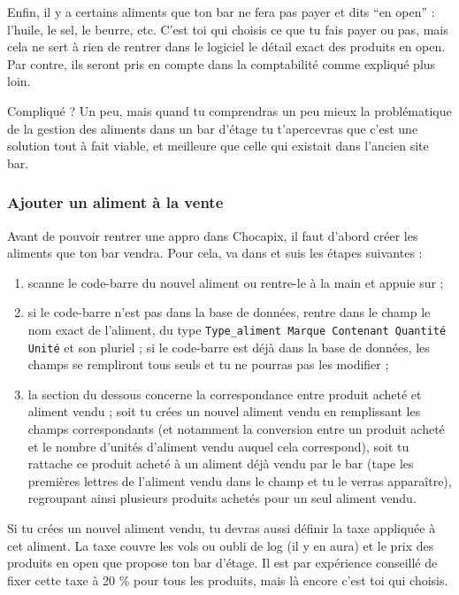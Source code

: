 \documentclass[12pt,french]{article}
\begin{document}
Enfin, il y a certains aliments que ton bar ne fera pas payer et dits \enquote{en open} : l'huile, le sel, le beurre, etc. C'est toi qui choisis ce que tu fais payer ou pas, mais cela ne sert à rien de rentrer dans le logiciel le détail exact des produits en open. Par contre, ils seront pris en compte dans la comptabilité comme expliqué plus loin.

Compliqué ? Un peu, mais quand tu comprendras un peu mieux la problématique de la gestion des aliments dans un bar d'étage tu t'apercevras que c'est une solution tout à fait viable, et meilleure que celle qui existait dans l'ancien site bar.

\subsubsection{Ajouter un aliment à la vente}

Avant de pouvoir rentrer une appro dans Chocapix, il faut d'abord créer les aliments que ton bar vendra. Pour cela, va dans  et suis les étapes suivantes :
\begin{enumerate}
	\item scanne le code-barre du nouvel aliment ou rentre-le à la main et appuie sur  ;
	\item si le code-barre n'est pas dans la base de données, rentre dans le champ  le nom exact de l'aliment, du type \texttt{Type\_aliment Marque Contenant Quantité Unité} et son pluriel ; si le code-barre est déjà dans la base de données, les champs se rempliront tous seuls et tu ne pourras pas les modifier ;
	\item la section du dessous concerne la correspondance entre produit acheté et aliment vendu ; soit tu crées un nouvel aliment vendu en remplissant les champs correspondants (et notamment la conversion entre un produit acheté et le nombre d'unités d'aliment vendu auquel cela correspond), soit tu rattache ce produit acheté à un aliment déjà vendu par le bar (tape les premières lettres de l'aliment vendu dans le champ  et tu le verras apparaître), regroupant ainsi plusieurs produits achetés pour un seul aliment vendu.
\end{enumerate}
Si tu crées un nouvel aliment vendu, tu devras aussi définir la taxe appliquée à cet aliment. La taxe couvre les vols ou oubli de log (il y en aura) et le prix des produits en open que propose ton bar d'étage. Il est par expérience conseillé de fixer cette taxe à 20 \% pour tous les produits, mais là encore c'est toi qui choisis.
\end{document}
